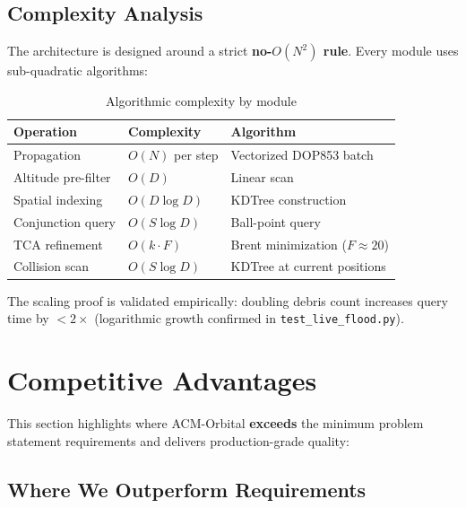 \documentclass[11pt,a4paper]{article}
\begin{document}
\subsection{Complexity Analysis}

The architecture is designed around a strict \textbf{no-$O(N^2)$ rule}.
Every module uses sub-quadratic algorithms:

\begin{table}[H]
\centering
\caption{Algorithmic complexity by module}
\begin{tabular}{@{}lll@{}}
\toprule
\textbf{Operation} & \textbf{Complexity} & \textbf{Algorithm} \\
\midrule
Propagation          & $O(N)$ per step   & Vectorized DOP853 batch \\
Altitude pre-filter  & $O(D)$            & Linear scan \\
Spatial indexing     & $O(D \log D)$     & KDTree construction \\
Conjunction query    & $O(S \log D)$     & Ball-point query \\
TCA refinement       & $O(k \cdot F)$    & Brent minimization ($F \approx 20$) \\
Collision scan       & $O(S \log D)$     & KDTree at current positions \\
\bottomrule
\end{tabular}
\end{table}

The scaling proof is validated empirically: doubling debris count increases
query time by $< 2\times$ (logarithmic growth confirmed in
\texttt{test\_live\_flood.py}).

\section{Competitive Advantages}

This section highlights where ACM-Orbital \textbf{exceeds} the minimum problem
statement requirements and delivers production-grade quality:

\subsection{Where We Outperform Requirements}
\end{document}
